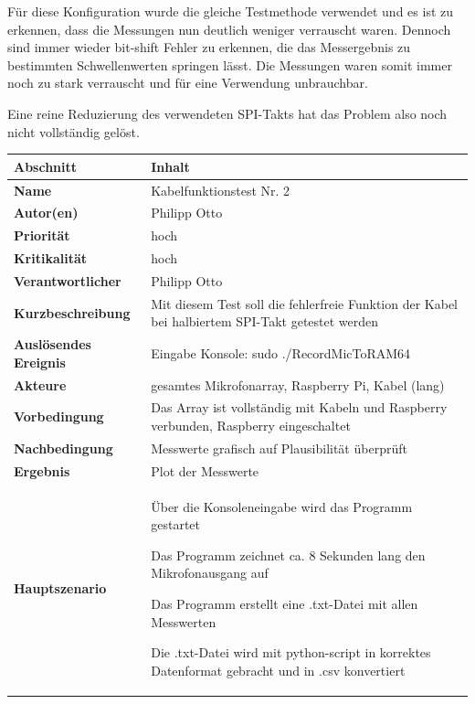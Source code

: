 Für diese Konfiguration wurde die gleiche Testmethode verwendet und es ist zu erkennen, dass die Messungen nun deutlich weniger verrauscht waren. Dennoch sind immer wieder bit-shift Fehler zu erkennen, die das Messergebnis zu bestimmten Schwellenwerten springen lässt. Die Messungen waren somit immer noch zu stark verrauscht und für eine Verwendung unbrauchbar. 

Eine reine Reduzierung des verwendeten SPI-Takts hat das Problem also noch nicht vollständig gelöst.

\begin{tabularx}{\columnwidth}{|p{4cm}|X|}
	\hline
	\textbf{Abschnitt} & \textbf{Inhalt}\\
	\hline
	\textbf{Name} & Kabelfunktionstest Nr. 2\\
	\hline
	\textbf{Autor(en)} & Philipp Otto\\
	\hline
	\textbf{Priorität} & hoch\\	
	\hline	
	\textbf{Kritikalität} & hoch\\
	\hline
	\textbf{Verantwortlicher} & Philipp Otto\\
	\hline
	\textbf{Kurzbeschreibung} &Mit diesem Test soll die fehlerfreie Funktion der Kabel bei halbiertem SPI-Takt getestet werden\\
	\hline
	\textbf{Auslösendes Ereignis} & Eingabe Konsole: \glqq sudo ./RecordMicToRAM64\grqq\\
	\hline
	\textbf{Akteure} & gesamtes Mikrofonarray, Raspberry Pi, Kabel (lang)\\
	\hline
	\textbf{Vorbedingung} & Das Array ist vollständig mit Kabeln und Raspberry verbunden, Raspberry eingeschaltet\\
	\hline
	\textbf{Nachbedingung} & Messwerte grafisch auf Plausibilität überprüft
	\\
	\hline
	\textbf{Ergebnis} & Plot der Messwerte\\
	\hline
	\textbf{Hauptszenario} & \begin{description}[font=\normalfont]
		\item[1.] Über die Konsoleneingabe wird das Programm gestartet
		\item[2.] Das Programm zeichnet ca. 8 Sekunden lang den Mikrofonausgang auf
		\item[3.] Das Programm erstellt eine .txt-Datei mit allen Messwerten
		\item[4.] Die .txt-Datei wird mit python-script in korrektes Datenformat gebracht und in .csv konvertiert

\end{description}
\end{tabularx}
